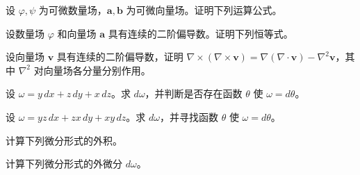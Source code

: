 \noindent\begin{minipage}{\textwidth}
设 $\varphi,\psi$ 为可微数量场，$\boldsymbol a,\boldsymbol b$ 为可微向量场。证明下列运算公式。
\end{minipage}\par\vfill
\noindent\begin{minipage}{\textwidth}
设数量场 $\varphi$ 和向量场 $\boldsymbol a$ 具有连续的二阶偏导数。证明下列恒等式。
\end{minipage}\par\vfill
\newpage
\noindent\begin{minipage}{\textwidth}
设向量场 $\boldsymbol v$ 具有连续的二阶偏导数，证明 $\nabla\times(\nabla\times\boldsymbol v)=\nabla(\nabla\cdot\boldsymbol v)-\nabla^2\boldsymbol v$，其中 $\nabla^2$ 对向量场各分量分别作用。
\end{minipage}\par\vfill
\noindent\begin{minipage}{\textwidth}
设 $\omega=y\,dx+z\,dy+x\,dz$。求 $d\omega$，并判断是否存在函数 $\theta$ 使 $\omega=d\theta$。
\end{minipage}\par\vfill
\noindent\begin{minipage}{\textwidth}
设 $\omega=yz\,dx+zx\,dy+xy\,dz$。求 $d\omega$，并寻找函数 $\theta$ 使 $\omega=d\theta$。
\end{minipage}\par\vfill
\noindent\begin{minipage}{\textwidth}
计算下列微分形式的外积。
\end{minipage}\par\vfill
\newpage
\noindent\begin{minipage}{\textwidth}
计算下列微分形式的外微分 $d\omega$。
\end{minipage}\par\vfill
